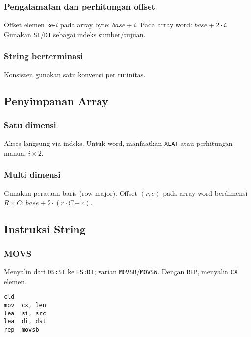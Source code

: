 \subsubsection{Pengalamatan dan perhitungan offset}
Offset elemen ke-\(i\) pada array byte: \(base + i\). Pada array word: \(base + 2\cdot i\). Gunakan \texttt{SI}/\texttt{DI} sebagai indeks sumber/tujuan.

\subsubsection{String berterminasi}
Konsisten gunakan satu konvensi per rutinitas.

\subsection{Penyimpanan Array}
\subsubsection{Satu dimensi}
Akses langsung via indeks. Untuk word, manfaatkan \texttt{XLAT} atau perhitungan manual \(i\times 2\).

\subsubsection{Multi dimensi}
Gunakan perataan baris (row-major). Offset \((r,c)\) pada array word berdimensi \(R\times C\): \(base + 2\cdot (r\cdot C + c)\).

\subsection{Instruksi String}
\subsubsection{MOVS}
Menyalin dari \texttt{DS:SI} ke \texttt{ES:DI}; varian \texttt{MOVSB}/\texttt{MOVSW}. Dengan \texttt{REP}, menyalin \texttt{CX} elemen.
\begin{verbatim}
cld
mov  cx, len
lea  si, src
lea  di, dst
rep  movsb
\end{verbatim}

